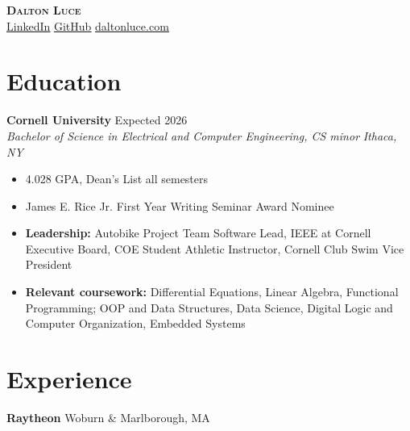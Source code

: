 \documentclass[letterpaper,10pt]{article}
\newcommand{\company}[2]{
    \vspace{6pt}
    {\large \textbf{#1}}
    \hfill
    {\normalsize {#2}}
    \\
}
\newcommand{\resumeEntry}[4]{
    \vspace{4pt}
    {\large \textbf{#1}}
    \hfill
    {\normalsize #2}
    \\
    \textit{#3} \hfill \textit{#4}
    \vspace{1pt}
}
\newcommand{\itemsBegin}{
    \begin{itemize}[leftmargin=0.2in, labelsep=0.05in, itemsep=0pt, parsep=1pt, topsep=0pt, partopsep=0pt]
}
\newcommand{\itemsEnd}{\end{itemize}}
\begin{document}
\textbf{\huge \scshape Dalton Luce} \\
\vspace{2pt}
\small
\addressConditional{}   %
\phoneConditional{}     %
\emailConditional{}     %
\href{https://www.linkedin.com/in/dalton-luce/}{\underline{LinkedIn}} %
\hspace{10pt}
\href{https://github.com/da-luce}{\underline{GitHub}}                 %
\hspace{10pt}
\href{https://daltonluce.com/}{\underline{daltonluce.com}}            %
\vspace{-5pt}

\section{Education}

    \resumeEntry{Cornell University}
        {Expected 2026}
        {Bachelor of Science in Electrical and Computer Engineering, CS minor}
        {Ithaca, NY}

    \itemsBegin{}
        \item 4.028 GPA, Dean's List all semesters
        \item James E. Rice Jr. First Year Writing Seminar Award Nominee
        \item \textbf{Leadership:} Autobike Project Team Software Lead, IEEE at Cornell Executive Board, COE Student Athletic Instructor, Cornell Club Swim Vice President
        \item \textbf{Relevant coursework:} Differential Equations, Linear Algebra, Functional Programming; OOP and Data Structures, Data Science, Digital Logic and Computer Organization, Embedded Systems
    \itemsEnd{}

\section{Experience}

    \company{Raytheon}{Woburn \& Marlborough, MA}
\end{document}
